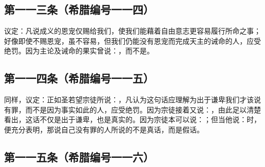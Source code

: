 
\subsection{第一一三条（希腊编号一一四）}

\par

议定：凡说成义的恩宠仅赐给我们，使我们能藉着自由意志更容易履行所命之事；好像即使不赐恩宠，虽不容易，但我们仍能没有恩宠而完成天主的诫命的人，应受绝罚。因为主论及诫命的果实曾说：，而不是。\par


\subsection{第一一四条（希腊编号一一五）}

\par

同样，议定：正如圣若望宗徒所说：，凡认为这句话应理解为出于谦卑我们才该说有罪，而不是因为事实如此的人，应受绝罚。因为宗徒接着又说：，由此足以清楚看出，这话不仅是出于谦卑，也是真实的。因为宗徒本可以说：；但当他说：时，便充分表明，那说自己没有罪的人所说的不是真话，而是假话。\par


\subsection{第一一五条（希腊编号一一六）}

\par

